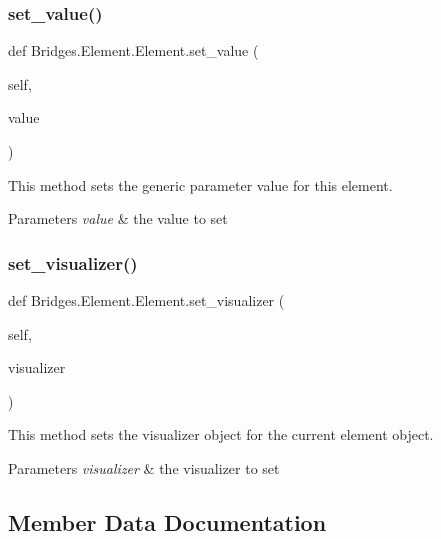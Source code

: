 \subsubsection{\texorpdfstring{set\+\_\+value()}{set\_value()}}
{\footnotesize\ttfamily def Bridges.\+Element.\+Element.\+set\+\_\+value (\begin{DoxyParamCaption}\item[{}]{self,  }\item[{}]{value }\end{DoxyParamCaption})}



This method sets the generic parameter value for this element. 


\begin{DoxyParams}{Parameters}
{\em value} & the value to set \\
\hline
\end{DoxyParams}
\mbox{\label{class_bridges_1_1_element_1_1_element_a43898806f4cc199664375bc690fea41e}} 
\subsubsection{\texorpdfstring{set\+\_\+visualizer()}{set\_visualizer()}}
{\footnotesize\ttfamily def Bridges.\+Element.\+Element.\+set\+\_\+visualizer (\begin{DoxyParamCaption}\item[{}]{self,  }\item[{}]{visualizer }\end{DoxyParamCaption})}



This method sets the visualizer object for the current element object. 


\begin{DoxyParams}{Parameters}
{\em visualizer} & the visualizer to set \\
\hline
\end{DoxyParams}


\subsection{Member Data Documentation}
\mbox{\label{class_bridges_1_1_element_1_1_element_a1e8b1911682fefbd043877a52c529b87}} 

